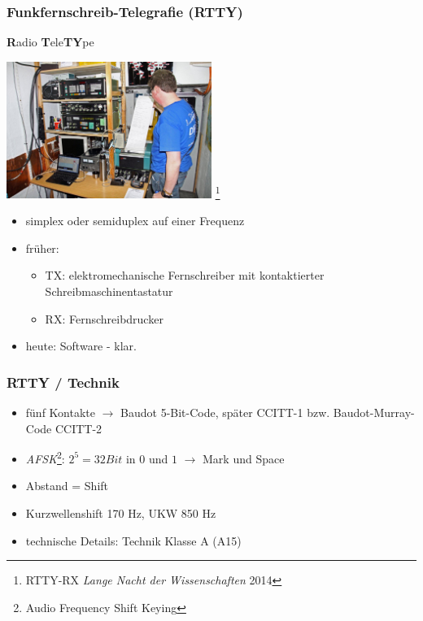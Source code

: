 \begin{frame}
    \frametitle{Funkfernschreib-Telegrafie (RTTY)}

    \textbf{R}adio \textbf{T}ele\textbf{TY}pe

    \begin{center}
        \includegraphics[width=0.5\textwidth,height=.35\textheight,keepaspectratio]{e16/RTTY_LNDW2014.jpg}
        \footnote{RTTY-RX \emph{Lange Nacht der Wissenschaften} 2014}
    \end{center}


    \begin{itemize}
        \item simplex oder semiduplex auf einer Frequenz
        \item früher:
            \begin{itemize}
                \item TX: elektromechanische Fernschreiber mit kontaktierter
                      Schreibmaschinentastatur
                \item RX: Fernschreibdrucker
            \end{itemize}
        \item heute: Software - klar.
    \end{itemize}

\end{frame}

\begin{frame}
    \frametitle{RTTY / Technik}

    \begin{itemize}
        \item fünf Kontakte $\rightarrow$ Baudot 5-Bit-Code, später CCITT-1 bzw. Baudot-Murray-Code CCITT-2
        \item \emph{AFSK}\footnote{Audio Frequency Shift Keying}:
              $2^5 = 32 Bit$ in $0$ und $1$ $\rightarrow$ Mark und Space
        \item Abstand = Shift
        \item Kurzwellenshift 170 Hz, UKW 850 Hz
        \item technische Details: Technik Klasse A (A15)
    \end{itemize}

\end{frame}

